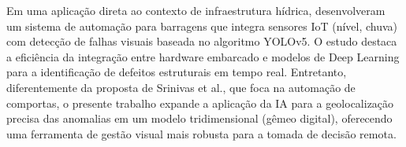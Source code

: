 Em uma aplicação direta ao contexto de infraestrutura hídrica,  desenvolveram um sistema de automação para barragens que integra sensores IoT (nível, chuva) com detecção de falhas visuais baseada no algoritmo YOLOv5. O estudo destaca a eficiência da integração entre hardware embarcado e modelos de Deep Learning para a identificação de defeitos estruturais em tempo real. Entretanto, diferentemente da proposta de Srinivas et al., que foca na automação de comportas, o presente trabalho expande a aplicação da IA para a geolocalização precisa das anomalias em um modelo tridimensional (gêmeo digital), oferecendo uma ferramenta de gestão visual mais robusta para a tomada de decisão remota.
